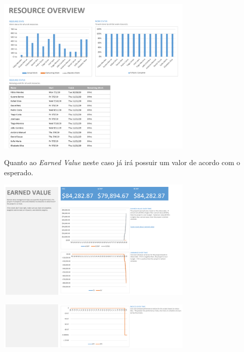 \begin{center}
    \includegraphics[width=0.7\textwidth]{media/baseline3ResourcesOverview.PNG}
\end{center}

Quanto ao \textit{Earned Value} neste caso já irá possuir um valor de acordo com o esperado.

\begin{center}
    \includegraphics[width=0.7\textwidth]{media/baseline3EarnedValue1.PNG}
\end{center}

\begin{center}
    \includegraphics[width=0.7\textwidth]{media/baseline3EarnedValue2.PNG}
\end{center}
